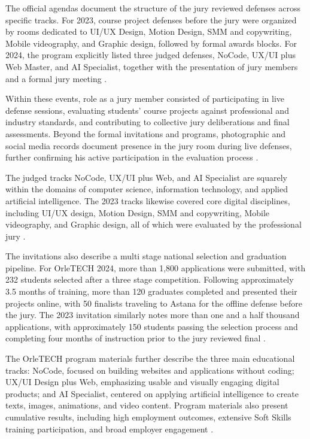 The official agendas document the structure of the jury reviewed defenses across specific tracks. For 2023, course project defenses before the jury were organized by rooms dedicated to UI/UX Design, Motion Design, SMM and copywriting, Mobile videography, and Graphic design, followed by formal awards blocks. For 2024, the program explicitly listed three judged defenses, NoCode, UX/UI plus Web Master, and AI Specialist, together with the presentation of jury members and a formal jury meeting .

Within these events, \mrls role as a jury member consisted of participating in live defense sessions, evaluating students’ course projects against professional and industry standards, and contributing to collective jury deliberations and final assessments. Beyond the formal invitations and programs, photographic and social media records document \mrls presence in the jury room during live defenses, further confirming his active participation in the evaluation process .

The judged tracks NoCode, UX/UI plus Web, and AI Specialist are squarely within the domains of computer science, information technology, and applied artificial intelligence. The 2023 tracks likewise covered core digital disciplines, including UI/UX design, Motion Design, SMM and copywriting, Mobile videography, and Graphic design, all of which were evaluated by the professional jury .

The invitations also describe a multi stage national selection and graduation pipeline. For OrleTECH 2024, more than 1,800 applications were submitted, with 232 students selected after a three stage competition. Following approximately 3.5 months of training, more than 120 graduates completed and presented their projects online, with 50 finalists traveling to Astana for the offline defense before the jury. The 2023 invitation similarly notes more than one and a half thousand applications, with approximately 150 students passing the selection process and completing four months of instruction prior to the jury reviewed final .

The OrleTECH program materials further describe the three main educational tracks: NoCode, focused on building websites and applications without coding; UX/UI Design plus Web, emphasizing usable and visually engaging digital products; and AI Specialist, centered on applying artificial intelligence to create texts, images, animations, and video content. Program materials also present cumulative results, including high employment outcomes, extensive Soft Skills training participation, and broad employer engagement .

